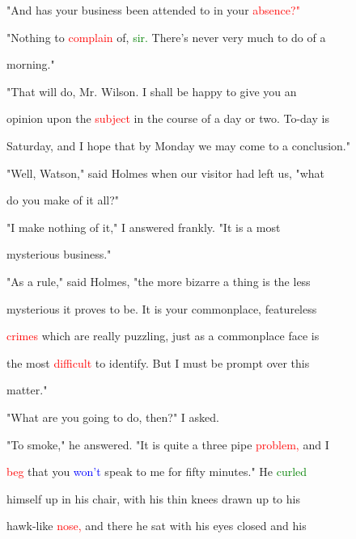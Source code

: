  "And has your business been attended to in your \textcolor{red}{absence?"}



 "Nothing to \textcolor{red}{complain} of, \textcolor{green}{sir.} There's never very much to do of a

 morning."



 "That will do, Mr. Wilson. I shall be \textcolor{BurntOrange}{happy} to give you an

 opinion upon the \textcolor{red}{subject} in the course of a day or two. To-day is

 Saturday, and I \textcolor{BurntOrange}{hope} that by Monday we may come to a conclusion."



 "Well, Watson," said Holmes when our \textcolor{BurntOrange}{visitor} had left us, "what

 do you make of it all?"



 "I make nothing of it," I answered frankly. "It is a most

 \textcolor{BurntOrange}{mysterious} business."



 "As a \textcolor{BurntOrange}{rule,"} said Holmes, "the more \textcolor{BurntOrange}{bizarre} a thing is the less

 \textcolor{BurntOrange}{mysterious} it proves to be. It is your \textcolor{BurntOrange}{commonplace,} featureless

 \textcolor{red}{crimes} which are really puzzling, just as a \textcolor{BurntOrange}{commonplace} face is

 the most \textcolor{red}{difficult} to identify. But I must be prompt over this

 matter."



 "What are you going to do, then?" I asked.



 "To smoke," he answered. "It is quite a three pipe \textcolor{red}{problem,} and I

 \textcolor{red}{beg} that you \textcolor{blue}{won't} speak to me for fifty minutes." He \textcolor{green}{curled}

 himself up in his chair, with his thin knees drawn up to his

 hawk-like \textcolor{red}{nose,} and there he sat with his eyes closed and his

